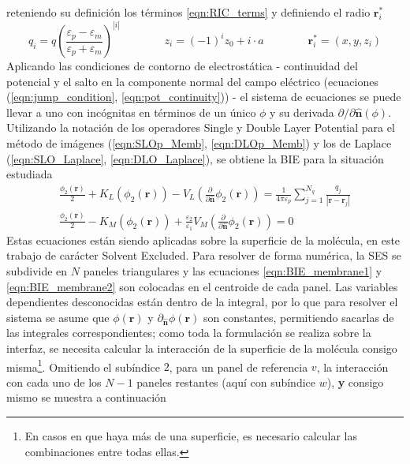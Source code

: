 \documentclass[12pt, twoside, onehalfspace, numbers, spanish]{ezthesis}
\numberwithin{equation}{section}
\begin{document}
reteniendo su definición los términos \ref{eqn:RIC_terms} y definiendo el radio $\mathbf{r}^*_i$
\begin{equation*}
q_i = q\left(\frac{\varepsilon_p - \varepsilon_m}{\varepsilon_p + \varepsilon_m}\right)^{|i|} \qquad\qquad z_i=(-1)^iz_0 + i\cdot a \qquad\qquad \mathbf{r}^*_i = (x, y, z_i)
\end{equation*}
Aplicando las condiciones de contorno de electrostática - continuidad del potencial y el salto en la componente normal del campo eléctrico (ecuaciones (\ref{eqn:jump_condition}, \ref{eqn:pot_continuity})) - el sistema de ecuaciones se puede llevar a uno con incógnitas en términos de un único $\phi$ y su derivada $\partial/\partial\hat{\mathbf{n}}(\phi)$. Utilizando la notación de los operadores Single y Double Layer Potential para el método de imágenes (\ref{eqn:SLOp_Memb}, \ref{eqn:DLOp_Memb}) y los de Laplace (\ref{eqn:SLO_Laplace}, \ref{eqn:DLO_Laplace}), se obtiene la BIE para la situación estudiada
\begin{gather}
\frac{\phi_2(\mathbf{r})}{2} + K_L(\phi_2(\mathbf{r})) - V_L\left(\frac{\partial}{\partial\hat{\mathbf{n}}}\phi_2(\mathbf{r})\right) = \frac{1}{4\pi\varepsilon_p}\sum_{j = 1}^{N_q}\frac{q_j}{|\mathbf{r} - \mathbf{r}_j|}\label{eqn:BIE_membrane1}\\
\frac{\phi_2(\mathbf{r})}{2} - K_M(\phi_2(\mathbf{r})) + \frac{\varepsilon_2}{\varepsilon_1}V_M\left(\frac{\partial}{\partial\hat{\mathbf{n}}}\phi_2(\mathbf{r})\right) = 0\label{eqn:BIE_membrane2}
\end{gather}
Estas ecuaciones están siendo aplicadas sobre la superficie de la molécula, en este trabajo de carácter Solvent Excluded. Para resolver de forma numérica, la SES se subdivide en $N$ paneles triangulares y las ecuaciones \ref{eqn:BIE_membrane1} y \ref{eqn:BIE_membrane2} son colocadas en el centroide de cada panel. Las variables dependientes desconocidas están dentro de la integral, por lo que para resolver el sistema se asume que $\phi(\mathbf{r})$ y $\partial_{\hat{\mathbf{n}}}\phi(\mathbf{r})$ son constantes, permitiendo sacarlas de las integrales correspondientes; como toda la formulación se realiza sobre la interfaz, se necesita calcular la interacción de la superficie de la molécula consigo misma\footnote{En casos en que haya más de una superficie, es necesario calcular las combinaciones entre todas ellas.}. Omitiendo el subíndice $2$, para un panel de referencia $v$, la interacción con cada uno de los $N-1$ paneles restantes (aquí con subíndice $w$), \textbf{y} consigo mismo se muestra a continuación
\end{document}
